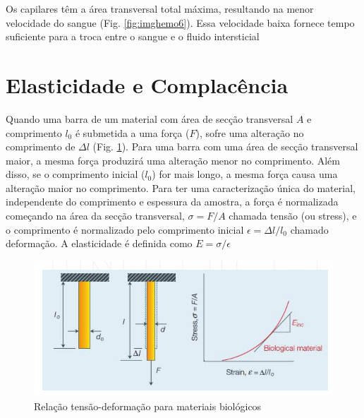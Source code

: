 \documentclass[
  portuguese,
  ]{book}
\begin{document}
Os capilares têm a área transversal total máxima, resultando na menor velocidade do sangue (Fig. \ref{fig:imghemo6}). Essa velocidade baixa fornece tempo suficiente para a troca entre o sangue e o fluido intersticial

\hypertarget{elasticidade-e-complacuxeancia}{%
\section{Elasticidade e Complacência}\label{elasticidade-e-complacuxeancia}}

Quando uma barra de um material com área de secção transversal \(A\) e comprimento \(l_0\) é submetida a uma força (\(F\)), sofre uma alteração no comprimento de \(\Delta l\) (Fig. \ref{fig:imghemo7}). Para uma barra com uma área de secção transversal maior, a mesma força produzirá uma alteração menor no comprimento. Além disso, se o comprimento inicial (\(l_0\)) for mais longo, a mesma força causa uma alteração maior no comprimento. Para ter uma caracterização única do material, independente do comprimento e espessura da amostra, a força é normalizada começando na área da secção transversal, \(\sigma = F/A\) chamada tensão (ou stress), e o comprimento é normalizado pelo comprimento inicial \(\epsilon = \Delta l/ l_0\) chamado deformação. A elasticidade é definida como \(E = \sigma / \epsilon\)

\begin{figure}

{\centering \includegraphics{img/hemo_7} 

}

\caption{Relação tensão-deformação para materiais biológicos}\label{fig:imghemo7}
\end{figure}
\end{document}
